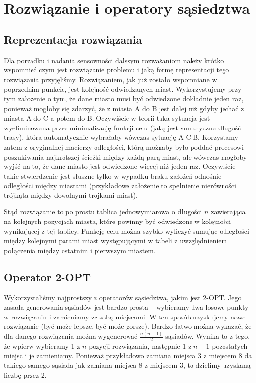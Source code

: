 \section{Rozwiązanie i operatory sąsiedztwa}
\subsection{Reprezentacja rozwiązania}
Dla porządku i nadania sensowności dalszym rozważaniom należy krótko wspomnieć czym jest rozwiązanie problemu i jaką formę reprezentacji tego rozwiązania przyjęliśmy. Rozwiązaniem, jak już zostało wspomniane w poprzednim punkcie, jest kolejność odwiedzanych miast. Wykorzystujemy przy tym założenie o tym, że dane miasto musi być odwiedzone dokładnie jeden raz, ponieważ mogłoby się zdarzyć, że z miasta A do B jest dalej niż gdyby jechać z miasta A do C a potem do B. Oczywiście w teorii taka sytuacja jest wyeliminowana przez minimalizację funkcji celu (jaką jest sumaryczna długość trasy), która automatycznie wybrałaby wówczas sytuację A-C-B. Korzystamy zatem z oryginalnej macierzy odległości, którą możnaby było poddać procesowi poszukiwania najkrótszej ścieżki między każdą parą miast, ale wówczas mogłoby wyjść na to, że dane miasto jest odwiedzone więcej niż jeden raz. Oczywiście takie stwierdzenie jest słuszne tylko w wypadku braku założeń odnośnie odległości między miastami (przykładowe założenie to spełnienie nierówności trójkąta między dowolnymi trójkami miast).

Stąd rozwiązanie to po prostu tablica jednowymiarowa o długości $n$ zawierająca na kolejnych pozycjach miasta, które powinny być odwiedzone w kolejności wynikającej z tej tablicy. Funkcję celu można szybko wyliczyć sumując odległości między kolejnymi parami miast występującymi w tabeli z uwzględnieniem połączenia między ostatnim i pierwszym miastem.

\subsection{Operator 2-OPT}

Wykorzystaliśmy najprostszy z operatorów sąsiedztwa, jakim jest 2-OPT. Jego zasada generowania sąsiadów jest bardzo prosta -- wybieramy dwa losowe punkty w rozwiązaniu i zamieniamy ze sobą miejscami. W ten sposób uzyskujemy nowe rozwiązanie (być może lepsze, być może gorsze). Bardzo łatwo można wykazać, że dla danego rozwiązania można wygenerować $\frac{n(n-1)}{2}$ sąsiadów. Wynika to z tego, że wpierw wybieramy 1 z $n$ pozycji rozwiązania, następnie 1 z $n-1$ pozostałych miejsc i je zamieniamy. Ponieważ przykładowo zamiana miejsca 3 z miejscem 8 da takiego samego sąsiada jak zamiana miejsca 8 z miejscem 3, to dzielimy uzyskaną liczbę przez 2.


